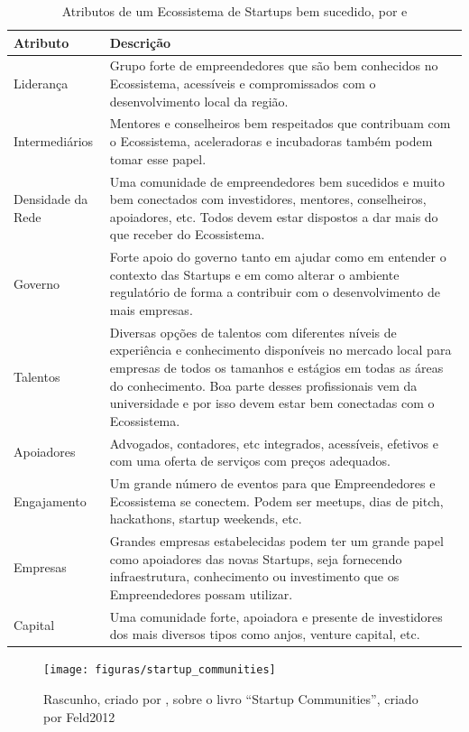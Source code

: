 \begin{table}[!htb]
	\centering
	\begin{tabular}{ | p{3cm} | p{12cm} | }
		\hline
		Atributo & Descrição \\ \hline
		Liderança & Grupo forte de empreendedores que são bem conhecidos no Ecossistema, acessíveis e compromissados com o desenvolvimento local da região. \\ \hline
		Intermediários & Mentores e conselheiros bem respeitados que contribuam com o Ecossistema, aceleradoras e incubadoras também podem tomar esse papel. \\ \hline
		Densidade da Rede & Uma comunidade de empreendedores bem sucedidos e muito bem conectados com investidores, mentores, conselheiros, apoiadores, etc. Todos devem estar dispostos a dar mais do que receber do Ecossistema. \\ \hline
		Governo & Forte apoio do governo tanto em ajudar como em entender o contexto das Startups e em como alterar o ambiente regulatório de forma a contribuir com o desenvolvimento de mais empresas. \\ \hline
		Talentos & Diversas opções de talentos com diferentes níveis de experiência e conhecimento disponíveis no mercado local para empresas de todos os tamanhos e estágios em todas as áreas do conhecimento. Boa parte desses profissionais vem da universidade e por isso devem estar bem conectadas com o Ecossistema. \\ \hline
		Apoiadores & Advogados, contadores, etc integrados, acessíveis, efetivos e com uma oferta de serviços com preços adequados. \\ \hline
		Engajamento & Um grande número de eventos para que Empreendedores e Ecossistema se conectem. Podem ser meetups, dias de pitch, hackathons, startup weekends, etc. \\ \hline
		Empresas & Grandes empresas estabelecidas podem ter um grande papel como apoiadores das novas Startups, seja fornecendo infraestrutura, conhecimento ou investimento que os Empreendedores possam utilizar. \\ \hline
		Capital &  Uma comunidade forte, apoiadora e presente de investidores dos mais diversos tipos como anjos, venture capital, etc. \\ \hline
	\end{tabular}
	\caption{Atributos de um Ecossistema de Startups bem sucedido, por \cite{Stam2015} e \cite{Feld2012}}
	\label{table:attributes_of_entrepreneurship_ecosystems}
\end{table}

\begin{figure}[!htb]
\centering
\texttt{[image: figuras/startup\_communities]}
\caption{Rascunho, criado por , sobre o livro ``Startup Communities'', criado por {Feld2012}}
\label{figure:startup_communities}
\end{figure}